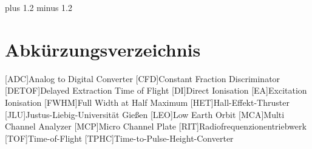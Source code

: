 \documentclass[fontsize=11pt,%
twoside,
BCOR          = 8mm]{scrreprt}
\author{Lorenz Saalmann}
\begin{document}
\font plus 1.2\font
minus 1.2\font






\cleardoublepage

\tableofcontents
\cleardoublepage

\listoffigures
\clearpage
\listoftables
\clearpage
\section*{\Large Abkürzungsverzeichnis}
\begin{acronym}
  [ADC]{\dotfill Analog to Digital Converter}  
  [CFD]{\dotfill Constant Fraction Discriminator}  
  [DETOF]{\dotfill Delayed Extraction Time of Flight}
  [DI]{\dotfill Direct Ionisation}  
  [EA]{\dotfill Excitation Ionisation}  
  [FWHM]{\dotfill Full Width at Half Maximum}  
  [HET]{\dotfill Hall-Effekt-Thruster}  
  [JLU]{\dotfill Justus-Liebig-Universit\"{a}t Gie{\ss}en}  
  [LEO]{\dotfill Low Earth Orbit}  
  [MCA]{\dotfill Multi Channel Analyzer}  
  [MCP]{\dotfill Micro Channel Plate}  
  [RIT]{\dotfill Radiofrequenzionentriebwerk}  
  [TOF]{\dotfill Time-of-Flight}  
  [TPHC]{\dotfill Time-to-Pulse-Height-Converter}  


\end{acronym}
\cleardoublepage

\onehalfspacing

\cleardoublepage


\cleardoublepage

\cleardoublepage

\cleardoublepage

\cleardoublepage

\clearpage

\cleardoublepage
\renewcommand\bibname{Literaturverzeichnis}
{}
\printbibliography
\cleardoublepage
\end{document}

